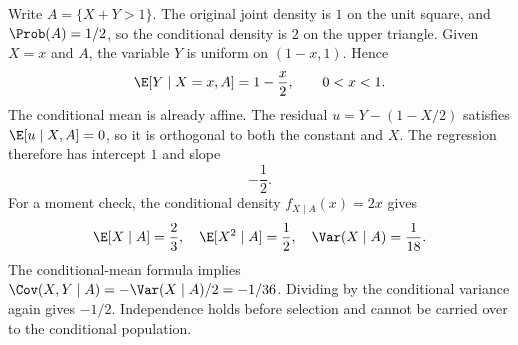 Write $A=\{X+Y>1\}$. The original joint density is $1$ on the unit square, and $\Prob(A)=1/2$, so the conditional density is $2$ on the upper triangle. Given $X=x$ and $A$, the variable $Y$ is uniform on $(1-x,1)$. Hence
\[
 \E[Y\mid X=x,A]=1-\frac x2,
 \qquad 0<x<1.
\]
The conditional mean is already affine. The residual $u=Y-(1-X/2)$ satisfies $\E[u\mid X,A]=0$, so it is orthogonal to both the constant and $X$. The regression therefore has intercept $1$ and slope
\[
 \boxed{-\frac12}.
\]
For a moment check, the conditional density $f_{X\mid A}(x)=2x$ gives
\[
 \E[X\mid A]=\frac23,\quad
 \E[X^2\mid A]=\frac12,\quad
 \Var(X\mid A)=\frac1{18}.
\]
The conditional-mean formula implies $\Cov(X,Y\mid A)=-\Var(X\mid A)/2=-1/36$. Dividing by the conditional variance again gives $-1/2$. Independence holds before selection and cannot be carried over to the conditional population.
